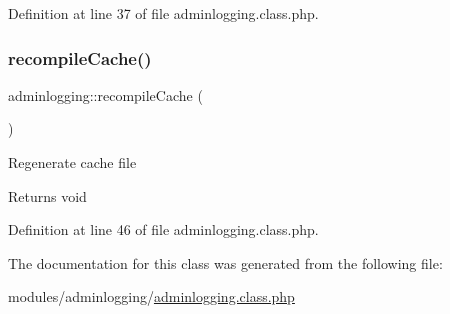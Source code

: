 Definition at line 37 of file adminlogging.\+class.\+php.

\hypertarget{classadminlogging_ad272a76b7aa666b084b7c0f6ab91b61c}{}\label{classadminlogging_ad272a76b7aa666b084b7c0f6ab91b61c} 
\subsubsection{\texorpdfstring{recompile\+Cache()}{recompileCache()}}
{\footnotesize\ttfamily adminlogging\+::recompile\+Cache (\begin{DoxyParamCaption}{ }\end{DoxyParamCaption})}

Regenerate cache file \begin{DoxyReturn}{Returns}
void 
\end{DoxyReturn}


Definition at line 46 of file adminlogging.\+class.\+php.



The documentation for this class was generated from the following file\+:\begin{DoxyCompactItemize}
\item 
modules/adminlogging/\hyperlink{adminlogging_8class_8php}{adminlogging.\+class.\+php}\end{DoxyCompactItemize}
